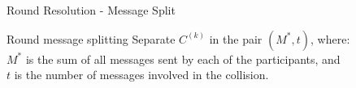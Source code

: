 \begin{frame}{Round Resolution - Message Split}
    \begin{block}{Round message splitting}
        Separate $C^{(k)}$ in the pair $(M^*, t)$, where:\\
        $M^*$ is the sum of all messages sent by each of the participants, and\\
        $t$ is the number of messages involved in the collision.
    \end{block}
\end{frame}